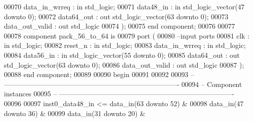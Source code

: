 \begin{DoxyCode}
00070       data_in_wrreq     : \textcolor{keywordflow}{in} \textcolor{comment}{std\_logic};
00071       data48_in         : \textcolor{keywordflow}{in} \textcolor{comment}{std\_logic\_vector}(\textcolor{vhdllogic}{}\textcolor{vhdllogic}{47} \textcolor{keywordflow}{downto} \textcolor{vhdllogic}{}\textcolor{vhdllogic}{0});
00072       data64_out        : \textcolor{keywordflow}{out} \textcolor{comment}{std\_logic\_vector}(\textcolor{vhdllogic}{}\textcolor{vhdllogic}{63} \textcolor{keywordflow}{downto} \textcolor{vhdllogic}{}\textcolor{vhdllogic}{0});
00073       data_out_valid    : \textcolor{keywordflow}{out} \textcolor{comment}{std\_logic}       
00074         );
00075 \textcolor{keywordflow}{end} \textcolor{keywordflow}{component};
00076 
00077 
00078 \textcolor{keywordflow}{component} pack_56_to_64 \textcolor{keywordflow}{is}
00079   \textcolor{keywordflow}{port} (
00080 \textcolor{keyword}{      --input ports }
00081       clk               : \textcolor{keywordflow}{in} \textcolor{comment}{std\_logic};
00082       reset_n           : \textcolor{keywordflow}{in} \textcolor{comment}{std\_logic};
00083       data_in_wrreq     : \textcolor{keywordflow}{in} \textcolor{comment}{std\_logic};
00084       data56_in         : \textcolor{keywordflow}{in} \textcolor{comment}{std\_logic\_vector}(\textcolor{vhdllogic}{}\textcolor{vhdllogic}{55} \textcolor{keywordflow}{downto} \textcolor{vhdllogic}{}\textcolor{vhdllogic}{0});
00085       data64_out        : \textcolor{keywordflow}{out} \textcolor{comment}{std\_logic\_vector}(\textcolor{vhdllogic}{}\textcolor{vhdllogic}{63} \textcolor{keywordflow}{downto} \textcolor{vhdllogic}{}\textcolor{vhdllogic}{0});
00086       data_out_valid    : \textcolor{keywordflow}{out} \textcolor{comment}{std\_logic}       
00087         );
00088 \textcolor{keywordflow}{end} \textcolor{keywordflow}{component};
00089   
00090 \textcolor{vhdlkeyword}{begin}
00091 
00092 
00093 \textcolor{keyword}{-- ----------------------------------------------------------------------------}
00094 \textcolor{keyword}{-- Component instances}
00095 \textcolor{keyword}{-- ----------------------------------------------------------------------------}
00096 
00097 inst0\_data48\_in <=   data\_in(\textcolor{vhdllogic}{63} \textcolor{keywordflow}{downto} \textcolor{vhdllogic}{52}) & 
00098                      \textcolor{vhdlchar}{data_in}\textcolor{vhdlchar}{(}\textcolor{vhdllogic}{}\textcolor{vhdllogic}{47} \textcolor{keywordflow}{downto} \textcolor{vhdllogic}{}\textcolor{vhdllogic}{36}\textcolor{vhdlchar}{)} \textcolor{vhdlchar}{&}
00099                      \textcolor{vhdlchar}{data_in}\textcolor{vhdlchar}{(}\textcolor{vhdllogic}{}\textcolor{vhdllogic}{31} \textcolor{keywordflow}{downto} \textcolor{vhdllogic}{}\textcolor{vhdllogic}{20}\textcolor{vhdlchar}{)} \textcolor{vhdlchar}{&}

\end{DoxyCode}
